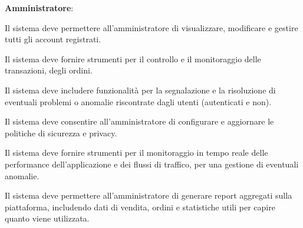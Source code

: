 \begin{rfenum}
        \newpage
    \item \textbf{Amministratore}:
        \begin{rfenum}
            \item Il sistema deve permettere all'amministratore di visualizzare, modificare e gestire tutti gli account registrati.
            \item Il sistema deve fornire strumenti per il controllo e il monitoraggio delle transazioni, degli ordini.
            \item Il sistema deve includere funzionalità per la segnalazione e la risoluzione di eventuali problemi o anomalie riscontrate dagli utenti (autenticati e non).
            \item  Il sistema deve consentire all'amministratore di configurare e aggiornare le politiche di sicurezza e privacy.
            \item Il sistema deve fornire strumenti per il monitoraggio in tempo reale delle performance dell'applicazione e dei flussi di traffico, per una gestione di eventuali anomalie.
            \item \hypertarget{RF3.6}{} Il sistema deve permettere all'amministratore di generare report aggregati sulla piattaforma, includendo dati di vendita, ordini e statistiche utili per capire quanto viene utilizzata. 
        \end{rfenum}
\end{rfenum}



